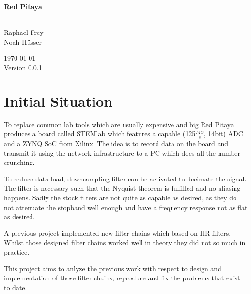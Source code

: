 \documentclass[a4paper,oneside]{alpenspecs/alpenspecs}
\begin{document}
\begin{titlingpage} %
    \flushright\sffamily

    \vspace*{5em}
    \Huge\bfseries{Red Pitaya}\\[1ex]
    \Large{}\\[3ex]

    \normalsize\mdseries

    \vfill
    Raphael Frey\\
    Noah H\"usser\\[3ex]

    \vspace{5em}

    \today\\
    Version 0.0.1
\end{titlingpage} %

\frontmatter %
\tableofcontents*

\mainmatter

\chapter{Initial Situation} %
\label{ch:initial}

To replace common lab tools which are usually expensive and big Red Pitaya produces a board called STEMlab which features a capable (125$\frac{MS}{s}$, 14bit) ADC and a ZYNQ SoC from Xilinx. The idea is to record data on the board and transmit it using the network infrastructure to a PC which does all the number crunching.

To reduce data load, downsampling filter can be activated to decimate the signal. The filter is necessary such that the Nyquist theorem is fulfilled and no aliasing happens. Sadly the stock filters are not quite as capable as desired, as they do not attenuate the stopband well enough and have a frequency response not as flat as desired.

A previous project implemented new filter chains which based on IIR filters. Whilst those designed filter chains worked well in theory they did not so much in practice.

This project aims to anlyze the previous work with respect to design and implementation of those filter chains, reproduce and fix the problems that exist to date.
\end{document}
